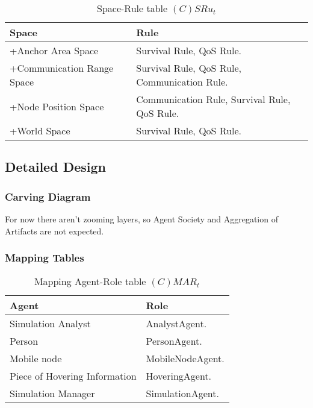 \begin{table}[H]
	\centering
	\begin{tabular}{|p{4cm}|p{8cm}|}
			\hline
			\textbf{Space} & \textbf{Rule} \\
			\hline
			+Anchor Area Space & Survival Rule, QoS Rule. \\
			\hline
			+Communication Range Space & Survival Rule, QoS Rule, Communication Rule. \\
			\hline
			+Node Position Space & Communication Rule, Survival Rule, QoS Rule. \\
			\hline
			+World Space & Survival Rule, QoS Rule. \\
			\hline
		\end{tabular}
	\caption{Space-Rule table $(C)SRu_t$}
	\label{tab:cot}
\end{table}

\subsection{Detailed Design}

\subsubsection{Carving Diagram}

For now there aren't zooming layers, so Agent Society and Aggregation of
Artifacts are not expected.

\subsubsection{Mapping Tables}

\begin{table}[H]
	\centering
	\begin{tabular}{|p{4cm}|p{8cm}|}
			\hline
			\textbf{Agent} & \textbf{Role} \\
			\hline
			Simulation Analyst & AnalystAgent. \\
			\hline
			Person & PersonAgent. \\
			\hline
			Mobile node & MobileNodeAgent.  \\
			\hline
			Piece of Hovering Information & HoveringAgent. \\
			\hline
			Simulation Manager & SimulationAgent. \\
			\hline
		\end{tabular}
	\caption{Mapping Agent-Role table $(C)MAR_t$}
	\label{tab:cmart}
\end{table}

